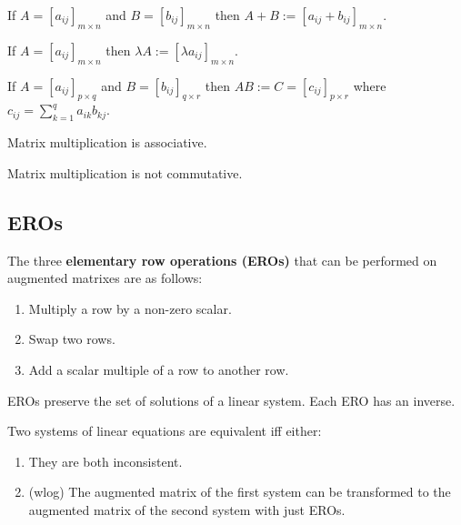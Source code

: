 \begin{definition}
    If $A = [a_{ij}]_{m\times n}$ and $B = [b_{ij}]_{m\times n}$ then $A+B := [a_{ij} + b_{ij}]_{m\times n}$.
\end{definition}

\begin{definition}
    If $A = [a_{ij}]_{m\times n}$ then $\lambda A := [\lambda a_{ij}]_{m\times n}$.
\end{definition}

\begin{definition}
    If $A = [a_{ij}]_{p\times q}$ and $B = [b_{ij}]_{q\times r}$ then $AB := C = [c_{ij}]_{p\times r}$ where $c_{ij} = \sum\limits_{k=1}^qa_{ik}b_{kj}$.
\end{definition}

\begin{theorem}
    Matrix multiplication is associative.
\end{theorem}

\begin{remark}
    Matrix multiplication is not commutative.
\end{remark}

\subsection{EROs}
\begin{definition}
    The three \textbf{elementary row operations (EROs)} that can be performed on augmented matrixes are as follows:
    \begin{enumerate}
        \item Multiply a row by a non-zero scalar.
        \item Swap two rows.
        \item Add a scalar multiple of a row to another row.
    \end{enumerate}
\end{definition}

\begin{remark}
    EROs preserve the set of solutions of a linear system. Each ERO has an inverse.
\end{remark}

\begin{definition}
    Two systems of linear equations are equivalent iff either:
    \begin{enumerate}
        \item They are both inconsistent.
        \item (wlog) The augmented matrix of the first system can be transformed to the augmented matrix of the second system with just EROs.
    \end{enumerate}
\end{definition}

